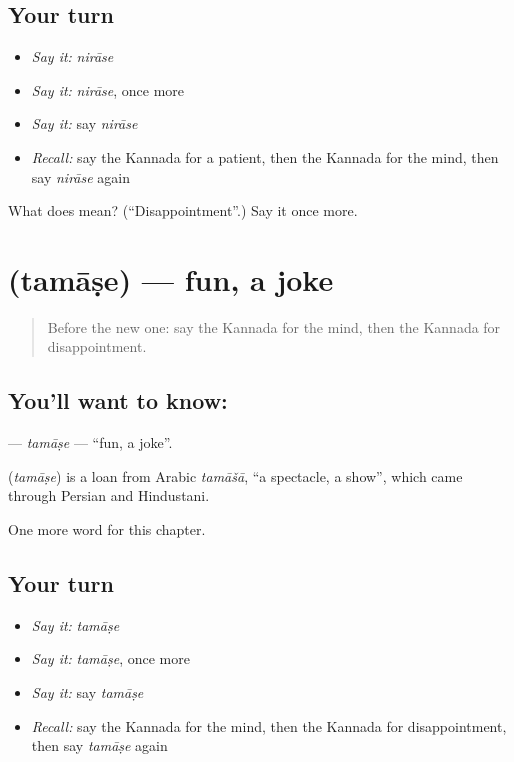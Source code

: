 \subsection*{Your turn}
\begin{itemize}
\raggedright
  \item \emph{Say it:} \emph{nirāse}
  \item \emph{Say it:} \emph{nirāse}, once more
  \item \emph{Say it:} say \emph{nirāse}
  \item \emph{Recall:} say the Kannada for a patient, then the Kannada for the mind, then say \emph{nirāse} again
\end{itemize}

\begin{tcolorbox}[breakable,colback=teal!4,colframe=teal!35!black,title={Before you move on}]
What does  mean? (\textquotedblleft{}Disappointment\textquotedblright{}.) Say it once more.
\end{tcolorbox}
\section[\texorpdfstring{\kn{ತಮಾಷೆ} (tamāṣe)}{ತಮಾಷೆ (tamāṣe)}]{ (tamāṣe) — fun, a joke}

\label{lesson:KA-C209-tamase}



\begin{quote}
Before the new one: say the Kannada for the mind, then the Kannada for disappointment.
\end{quote}

\subsection*{You'll want to know: }
\textbf{} — \emph{tamāṣe} — \textquotedblleft{}fun, a joke\textquotedblright{}.

\begin{cousinweb}
\textbf{} (\emph{tamāṣe}) is a loan from Arabic \emph{tamāšā}, \textquotedblleft{}a spectacle, a show\textquotedblright{}, which came through Persian and Hindustani.
\end{cousinweb}

\begin{grammarlens}[title={What you've built}]
One more word for this chapter.
\end{grammarlens}

\subsection*{Your turn}
\begin{itemize}
\raggedright
  \item \emph{Say it:} \emph{tamāṣe}
  \item \emph{Say it:} \emph{tamāṣe}, once more
  \item \emph{Say it:} say \emph{tamāṣe}
  \item \emph{Recall:} say the Kannada for the mind, then the Kannada for disappointment, then say \emph{tamāṣe} again
\end{itemize}

